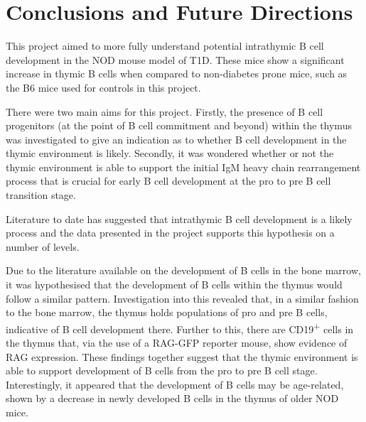 





\section{Conclusions and Future Directions}

This project aimed to more fully understand potential intrathymic B cell development in the NOD mouse model of T1D.
These mice show a significant increase in thymic B cells when compared to non-diabetes prone mice, such as the B6 mice used for controls in this project.

There were two main aims for this project. Firstly, the presence of B cell progenitors (at the point of B cell commitment and beyond) within the thymus was investigated to give an indication as to whether B cell development in the thymic environment is likely.
Secondly, it was wondered whether or not the thymic environment is able to support the initial IgM heavy chain rearrangement process that is crucial for early B cell development at the pro to pre B cell transition stage.

Literature to date has suggested that intrathymic B cell development is a likely process and the data presented in the project supports this hypothesis on a number of levels.

Due to the literature available on the development of B cells in the bone marrow, it was hypothesised that the development of B cells within the thymus would follow a similar pattern.
Investigation into this revealed that, in a similar fashion to the bone marrow, the thymus holds populations of pro and pre B cells, indicative of B cell development there.
Further to this, there are CD19\textsuperscript{+} cells in the thymus that, via the use of a RAG-GFP reporter mouse, show evidence of RAG expression.
These findings together suggest that the thymic environment is able to support development of B cells from the pro to pre B cell stage.
Interestingly, it appeared that the development of B cells may be age-related, shown by a decrease in newly developed B cells in the thymus of older NOD mice.


